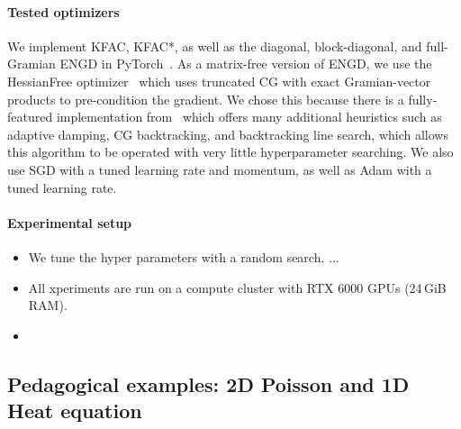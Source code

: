 


\paragraph{Tested optimizers}
We implement KFAC, KFAC*, as well as the diagonal, block-diagonal, and full-Gramian ENGD in PyTorch~\citep{paszke2019pytorch}.
As a matrix-free version of ENGD, we use the HessianFree optimizer~\citep{?} which uses truncated CG with exact Gramian-vector products to pre-condition the gradient.
We chose this because there is a fully-featured implementation from~\citet{tatzel2022late} which offers many additional heuristics such as adaptive damping, CG backtracking, and backtracking line search, which allows this algorithm to be operated with very little hyperparameter searching.
We also use SGD with a tuned learning rate and momentum, as well as Adam with a tuned learning rate.

\paragraph{Experimental setup}
\begin{itemize}
\item We tune the hyper parameters with a random search. ... 
\item All xperiments are run on a compute cluster with RTX 6000 GPUs (24\,GiB RAM).
\item 
\end{itemize}


\subsection{Pedagogical examples: 2D Poisson and 1D Heat equation}

